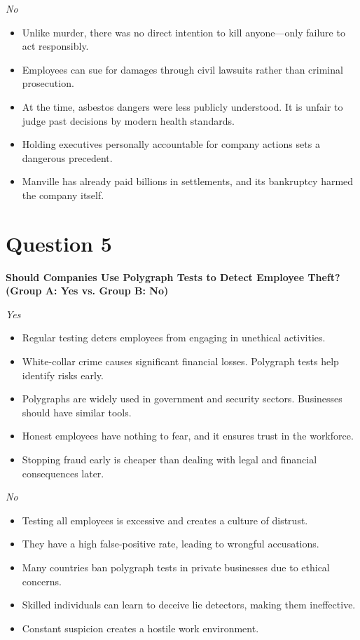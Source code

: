 \documentclass{article}
\begin{document}
\textit{No}
\begin{itemize}
    \item Unlike murder, there was no direct intention to kill anyone—only failure to act responsibly.
    \item Employees can sue for damages through civil lawsuits rather than criminal prosecution.
    \item At the time, asbestos dangers were less publicly understood. It is unfair to judge past decisions by modern health standards.
    \item Holding executives personally accountable for company actions sets a dangerous precedent.
    \item Manville has already paid billions in settlements, and its bankruptcy harmed the company itself.
\end{itemize}

\section*{Question 5}
\textbf{Should Companies Use Polygraph Tests to Detect Employee Theft? (Group A: Yes vs. Group B: No)}

\textit{Yes}
\begin{itemize}
    \item Regular testing deters employees from engaging in unethical activities.
    \item White-collar crime causes significant financial losses. Polygraph tests help identify risks early.
    \item Polygraphs are widely used in government and security sectors. Businesses should have similar tools.
    \item Honest employees have nothing to fear, and it ensures trust in the workforce.
    \item Stopping fraud early is cheaper than dealing with legal and financial consequences later.
\end {itemize}

\textit{No}
\begin{itemize}
    \item Testing all employees is excessive and creates a culture of distrust.
    \item They have a high false-positive rate, leading to wrongful accusations.
    \item Many countries ban polygraph tests in private businesses due to ethical concerns.
    \item Skilled individuals can learn to deceive lie detectors, making them ineffective.
    \item Constant suspicion creates a hostile work environment.
\end{itemize}
\end{document}
